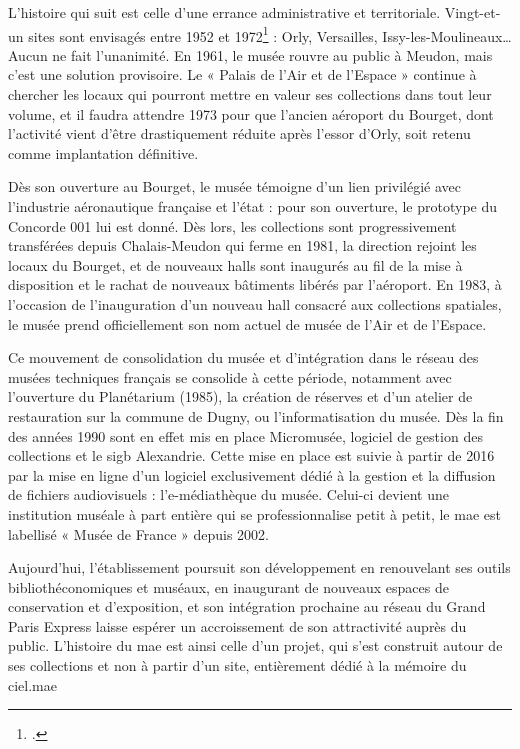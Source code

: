 L’histoire qui suit est celle d’une errance administrative et territoriale. Vingt-et-un sites sont envisagés entre 1952 et 1972\footcite{terrier_eroport_2019} : Orly, Versailles, Issy-les-Moulineaux… Aucun ne fait l’unanimité. En 1961, le musée rouvre au public à Meudon, mais c’est une solution provisoire. Le « Palais de l’Air et de l’Espace » continue à chercher les locaux qui pourront mettre en valeur ses collections dans tout leur volume, et il faudra attendre 1973 pour que l'ancien aéroport du Bourget, dont l'activité vient d'être drastiquement réduite après l’essor d'Orly, soit retenu comme implantation définitive.

Dès son ouverture au Bourget, le musée témoigne d'un lien privilégié avec l'industrie aéronautique française et l'état : pour son ouverture, le prototype du Concorde 001 lui est donné. Dès lors, les collections sont progressivement transférées depuis Chalais-Meudon qui ferme en 1981, la direction rejoint les locaux du Bourget, et de nouveaux halls sont inaugurés au fil de la mise à disposition et le rachat de nouveaux bâtiments libérés par l'aéroport. En 1983, à l'occasion de l'inauguration d'un nouveau hall consacré aux collections spatiales, le musée prend officiellement son nom actuel de musée de l'Air et de l'Espace.

Ce mouvement de consolidation du musée et d'intégration dans le réseau des musées techniques français se consolide à cette période, notamment avec l'ouverture du Planétarium (1985), la création de réserves et d'un atelier de restauration sur la commune de Dugny,  ou l'informatisation du musée. Dès la fin des années 1990 sont en effet mis en place Micromusée, logiciel de gestion des collections et le \ac{sigb} Alexandrie. Cette mise en place est suivie à partir de 2016 par la mise en ligne d'un logiciel exclusivement dédié à la gestion et la diffusion de fichiers audiovisuels : l'e-médiathèque du musée. Celui-ci devient une institution muséale à part entière qui se professionnalise petit à petit, le \ac{mae} est labellisé « Musée de France » depuis 2002.

Aujourd’hui, l’établissement poursuit son développement en renouvelant ses outils bibliothéconomiques et muséaux, en inaugurant de nouveaux espaces de conservation et d'exposition, et son intégration prochaine au réseau du Grand Paris Express laisse espérer un accroissement de son attractivité auprès du public. L’histoire du \ac{mae} est ainsi celle d'un projet, qui s’est construit autour de ses collections et non à partir d’un site, entièrement dédié à la mémoire du ciel.\ac{mae}

